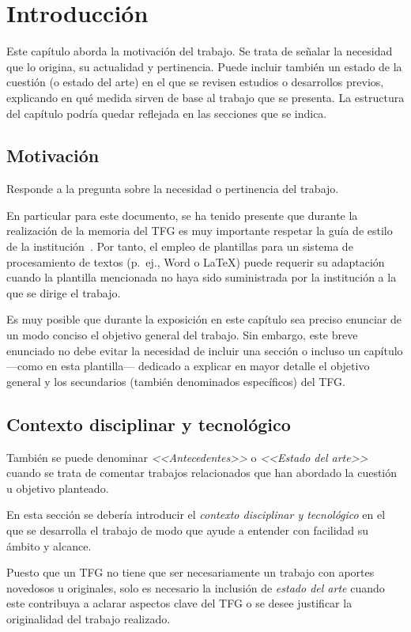 \chapter{Introducción}
\label{cap:Introduccion}

Este capítulo aborda la motivación del trabajo. Se trata de señalar la necesidad que lo origina, su actualidad y pertinencia. Puede incluir también un estado de la cuestión (o estado del arte) en el que se revisen estudios o desarrollos previos, explicando en qué medida sirven de base al trabajo que se presenta. La estructura del capítulo podría quedar reflejada en las secciones que se indica.

\section{Motivación}
Responde a la pregunta sobre la necesidad o pertinencia del trabajo.

En particular para este documento, se ha tenido presente que durante la realización de la memoria del TFG es muy importante respetar la guía de estilo de la institución~\cite{esi19}. Por tanto, el empleo de plantillas para un sistema de procesamiento de textos (p.~ej., Word o \LaTeX) puede requerir su adaptación cuando la plantilla mencionada no haya sido suministrada por la institución a la que se dirige el trabajo.

Es muy posible que durante la exposición en este capítulo sea preciso enunciar de un modo conciso el objetivo general del trabajo. Sin embargo, este breve enunciado no debe evitar la necesidad de incluir una sección o incluso un capítulo ---como en esta plantilla--- dedicado a explicar en mayor detalle el objetivo general y los secundarios (también denominados específicos) del TFG.

\section{Contexto disciplinar y tecnológico}
También se puede denominar \emph{<<Antecedentes>>} o \emph{<<Estado del arte>>} cuando se trata de comentar trabajos relacionados que han abordado la cuestión u objetivo planteado.

En esta sección se debería introducir el \emph{contexto disciplinar y tecnológico} en el que se desarrolla el trabajo de modo que ayude a entender con facilidad su ámbito y alcance. 

Puesto que un TFG no tiene que ser necesariamente un trabajo con aportes novedosos u originales, solo es necesario la inclusión de \emph{estado del arte} cuando este contribuya a aclarar aspectos clave del TFG o se desee justificar la originalidad del trabajo realizado.

